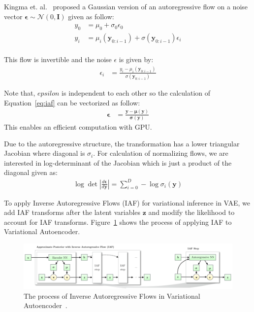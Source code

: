\documentclass[runningheads]{llncs}
\begin{document}
Kingma et. al.~\cite{kingma2016improved} proposed a Gaussian version of an autoregressive flow on a noise vector $\mathbf{\epsilon} \sim \mathcal{N}(0,\mathbf{I})$ given as follow:
\begin{align}
y_0 &= \mu_0 + \sigma_0 \epsilon_0\\
y_i &= \mu_i(\mathbf{y}_{0:i-1}) + \sigma(\mathbf{y}_{0:i-1}) \epsilon_i\\
\end{align} 

This flow is invertible and the noise $\epsilon$ is given by:
\begin{align}
\epsilon_i &= \frac{y_i - \mu_i(\mathbf{y}_{0:i-1})}{\sigma(\mathbf{y}_{0:i-1})}
\label{eq:iaf}
\end{align} 

Note that, $epsilon$ is independent to each other so the calculation of Equation~\ref{eq:iaf} can be vectorized as follow:
\begin{align}
\bm{\epsilon} &= \frac{\mathbf{y} - \bm{\mu}(\mathbf{y})}{\bm{\sigma}(\mathbf{y})}
\end{align} 
This enables an efficient computation with GPU. 

Due to the autoregressive structure, the transformation has a lower triangular Jacobian where diagonal is $\sigma_i$. For calculation of normalizing flows, we are interested in log-determinant of the Jacobian which is just a product of the diagonal given as:
\begin{align}
\log \det \left| \frac{d\bm{\epsilon}}{d\mathbf{y}} \right| = \sum_{i=0}^{D} - \log \sigma_i(\mathbf{y})
\end{align}

To apply Inverse Autoregressive Flows (IAF) for variational inference in VAE, we add IAF transforms after the latent variables $\mathbf{z}$ and modify the likelihood to account for IAF transforms. Figure~\ref{fig:iaf} shows the process of applying IAF to Variational Autoencoder. 

\begin{figure}[htb]
	\centering
	\includegraphics[width=\textwidth]{imgs/iaf}
	\caption{The process of Inverse Autoregressive Flows in Variational Autoencoder~\cite{kingma2016improved}.}
	\label{fig:iaf}
\end{figure}
\end{document}
